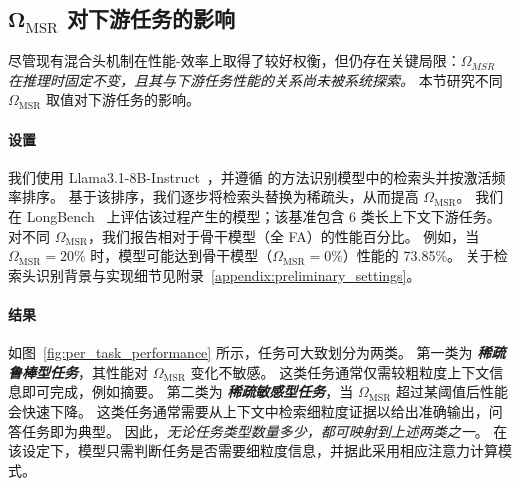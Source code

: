 \subsection{$\mathbf{\Omega_\mathrm{MSR}}$ 对下游任务的影响}
\label{subsec:deployment_sparisity}
尽管现有混合头机制在性能-效率上取得了较好权衡，但仍存在关键局限：\emph{$\mathit{\Omega_\mathit{MSR}}$ 在推理时固定不变，且其与下游任务性能的关系尚未被系统探索。}
本节研究不同 $\Omega_\mathrm{MSR}$ 取值对下游任务的影响。

\paragraph{设置}
我们使用 Llama3.1-8B-Instruct~\citep{grattafiori2024llama}，并遵循 \citet{wu2024retrieval} 的方法识别模型中的检索头并按激活频率排序。
基于该排序，我们逐步将检索头替换为稀疏头，从而提高 $\Omega_\mathrm{MSR}$。
我们在 LongBench~\citep{bai2024longbench} 上评估该过程产生的模型；该基准包含 6 类长上下文下游任务。
对不同 $\Omega_\mathrm{MSR}$，我们报告相对于骨干模型（全 FA）的性能百分比。
例如，当 $\Omega_\mathrm{MSR}=20\%$ 时，模型可能达到骨干模型（$\Omega_\mathrm{MSR}=0\%$）性能的 73.85\%。
关于检索头识别背景与实现细节见附录~\ref{appendix:preliminary_settings}。

\paragraph{结果}
如图~\ref{fig:per_task_performance} 所示，任务可大致划分为两类。
第一类为 \emph{\textbf{稀疏鲁棒型任务}}，其性能对 $\Omega_\mathrm{MSR}$ 变化不敏感。
这类任务通常仅需较粗粒度上下文信息即可完成，例如摘要。
第二类为 \emph{\textbf{稀疏敏感型任务}}，当 $\Omega_\mathrm{MSR}$ 超过某阈值后性能会快速下降。
这类任务通常需要从上下文中检索细粒度证据以给出准确输出，问答任务即为典型。
因此，\emph{无论任务类型数量多少，都可映射到上述两类之一}。
在该设定下，模型只需判断任务是否需要细粒度信息，并据此采用相应注意力计算模式。
